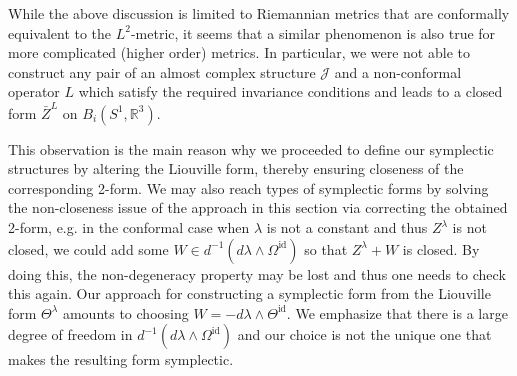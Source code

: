 \documentclass[12pt]{amsart}
\newcommand{\AuthorCOMMENT}[3]{\textcolor{#2}{{[\textbf{#1:} \textsl{#3}}]}}  %
\newcommand{\Martin}[1]{\AuthorCOMMENT{Martin}{blue}{#1}}
\newcommand{\rev}[1]{#1}
\theoremstyle{definition}
\newcommand{\R}{\mathbb R}
\newcommand{\id}{\mathrm{id}}
\newcommand{\OmMW}{\Omega^{\operatorname{MW}}}
\def\la{\lambda}
\def\Th{\Theta}
\def\Om{\Omega}
\def\L{\mathcal{L}}
\def\J{\mathcal{J}}
\def\R{{\mathbb R}}
\let\on=\operatorname
\begin{document}

While the above discussion is limited to Riemannian metrics that are conformally equivalent to the $L^2$-metric, it seems that a similar phenomenon is also true for more complicated (higher order) metrics. In particular, we were not able to construct any pair of an almost complex structure $\J$ and a non-conformal operator $L$  which satisfy the required invariance conditions and leads to a closed form \rev{$\bar Z^{L}$} on $B_i(S^1,\R^3)$.

This observation is the main reason why we proceeded to define our symplectic structures 
by altering the Liouville form, thereby ensuring closeness of the corresponding 2-form.   We may also reach types of symplectic forms by solving the non-closeness issue of the approach in this section via correcting the obtained 2-form, e.g. in the conformal case when $\la$ is not a constant and thus \rev{$Z^\la$} is not closed, we could add some $W\in d^{-1}(d\la\wedge \Om^\id) $ so that $Z^\lambda+W$ is closed. By doing this, the non-degeneracy property may be lost and thus one needs to check this again. Our approach for constructing a symplectic form from the Liouville form $\Th^\la$  amounts to choosing $W=-d\la \wedge \Th^\id$. We emphasize that there is a large degree of freedom in $d^{-1}(d\la\wedge \Om^\id)$ and our choice is not the unique one that makes the resulting form symplectic. 
\end{document}
